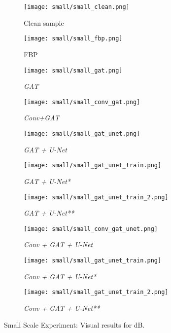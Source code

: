 \begin{figure}[H]
  \captionsetup[subfigure]{justification=centering}
  \centering
  \begin{subfigure}[t]{0.16\textwidth}
    \texttt{[image: small/small\_clean.png]}
    \caption{Clean sample}
    \label{fig:small_clean_sample_overview}
  \end{subfigure} \hfill
  \begin{subfigure}[t]{0.16\textwidth}
    \texttt{[image: small/small\_fbp.png]}
    \caption{FBP}
  \end{subfigure} \hfill
  \begin{subfigure}[t]{0.16\textwidth}
    \texttt{[image: small/small\_gat.png]}
    \caption{\textit{GAT}}
  \end{subfigure} \hfill
  \begin{subfigure}[t]{0.16\textwidth}
    \texttt{[image: small/small\_conv\_gat.png]}
    \caption{\textit{Conv+GAT}}
  \end{subfigure} \hfill
  \begin{subfigure}[t]{0.16\textwidth}
    \texttt{[image: small/small\_gat\_unet.png]}
    \caption{\textit{GAT + U-Net}}
  \end{subfigure}

  \begin{subfigure}[t]{0.16\textwidth}
    \texttt{[image: small/small\_gat\_unet\_train.png]}
    \caption{\textit{GAT + U-Net*}}
  \end{subfigure} \hfill
  \begin{subfigure}[t]{0.16\textwidth}
    \texttt{[image: small/small\_gat\_unet\_train\_2.png]}
    \caption{\textit{GAT + U-Net**}}
  \end{subfigure} \hfill
  \begin{subfigure}[t]{0.16\textwidth}
    \texttt{[image: small/small\_conv\_gat\_unet.png]}
    \caption{\textit{Conv + GAT + U-Net}}
  \end{subfigure} \hfill
  \begin{subfigure}[t]{0.16\textwidth}
    \texttt{[image: small/small\_gat\_unet\_train.png]}
    \caption{\textit{Conv + GAT + U-Net*}}
  \end{subfigure} \hfill
  \begin{subfigure}[t]{0.16\textwidth}
    \texttt{[image: small/small\_gat\_unet\_train\_2.png]}
    \caption{\textit{Conv + GAT + U-Net**}}
  \end{subfigure}
  \caption{Small Scale Experiment: Visual results for  dB.}
  \label{fig:small_components_overview}
\end{figure}

